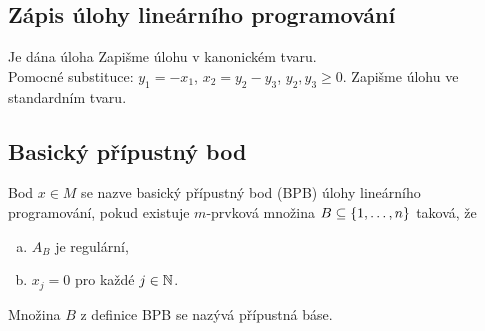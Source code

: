 \subsection{Zápis úlohy lineárního programování}
Je dána úloha
Zapišme úlohu v kanonickém tvaru.\\
Pomocné substituce: $y_1 = -x_1$, $x_2 = y_2 - y_3$, $y_2, y_3 \geq 0$.
Zapišme úlohu ve standardním tvaru.

\subsection{Basický přípustný bod}\label{BPB}
Bod $x \in M$ se nazve basický přípustný bod (BPB) úlohy lineárního programování, pokud existuje $m$-prvková množina
$B \subseteq \left\lbrace 1, \dots, n \right\rbrace$ taková, že
\begin{enumerate}[(a)]
    \item $A_B$ je regulární,
    \item $x_j = 0$ pro každé $j \in \mathbb{N}$.
\end{enumerate}
Množina $B$ z definice BPB se nazývá přípustná báse.

